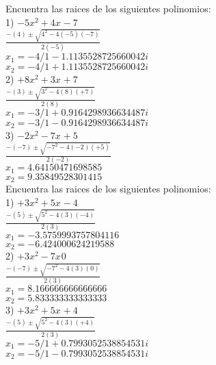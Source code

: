 \documentclass[a4paper,12pt]{article}
\begin{document}
 \pagebreak 
Encuentra las raices de los siguientes polinomios: \vspace{1cm}\\ 
1) $ -5x^{2}+4x^{}-7$ 
\vspace{0.5cm}\\ 
$\frac{-(4)\pm\sqrt{4^2-4(-5)(-7)}  }{2(-5)}$
\vspace{0.5cm}\\
$x_1=-4/1-1.1135528725660042i$\\
$x_2=-4/1+1.1135528725660042i$
\vspace{1cm}\\ 
2) $ +8x^{2}+3x^{}+7$ 
\vspace{0.5cm}\\ 
$\frac{-(3)\pm\sqrt{3^2-4(8)(+7)}  }{2(8)}$
\vspace{0.5cm}\\
$x_1=-3/1+0.9164298936634487i$\\
$x_2=-3/1-0.9164298936634487i$
\vspace{1cm}\\ 
3) $ -2x^{2}-7x^{}+5$ 
\vspace{0.5cm}\\ 
$\frac{-(-7)\pm\sqrt{-7^2-4(-2)(+5)}  }{2(-2)}$
\vspace{0.5cm}\\
$x_1=4.64150471698585$\\
$x_2=9.35849528301415$
\vspace{1cm}\\ 

 \pagebreak 
Encuentra las raices de los siguientes polinomios: \vspace{1cm}\\ 
1) $ +3x^{2}+5x^{}-4$ 
\vspace{0.5cm}\\ 
$\frac{-(5)\pm\sqrt{5^2-4(3)(-4)}  }{2(3)}$
\vspace{0.5cm}\\
$x_1=-3.5759993757804116$\\
$x_2=-6.424000624219588$
\vspace{1cm}\\ 
2) $ +3x^{2}-7x^{}0$ 
\vspace{0.5cm}\\ 
$\frac{-(-7)\pm\sqrt{-7^2-4(3)(0)}  }{2(3)}$
\vspace{0.5cm}\\
$x_1=8.166666666666666$\\
$x_2=5.833333333333333$
\vspace{1cm}\\ 
3) $ +3x^{2}+5x^{}+4$ 
\vspace{0.5cm}\\ 
$\frac{-(5)\pm\sqrt{5^2-4(3)(+4)}  }{2(3)}$
\vspace{0.5cm}\\
$x_1=-5/1+0.7993052538854531i$\\
$x_2=-5/1-0.7993052538854531i$
\vspace{1cm}\\ 
\end{document}

